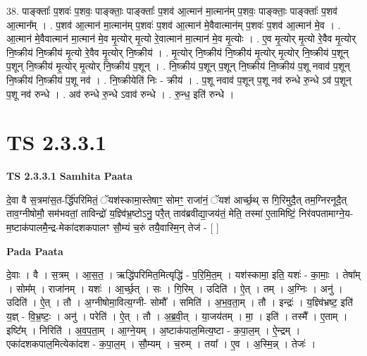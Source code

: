 \documentclass[17pt]{extarticle}
\begin{document}
38. पाङ्क्ताः᳚ प॒शवः॑ प॒शवः॒ पाङ्क्ताः॒ पाङ्क्ताः᳚ प॒शव॑ आ॒त्मान॑ मा॒त्मान॑म् प॒शवः॒ पाङ्क्ताः॒ पाङ्क्ताः᳚ प॒शव॑ आ॒त्मान᳚म् । . प॒शव॑ आ॒त्मान॑ मा॒त्मान॑म् प॒शवः॑ प॒शव॑ आ॒त्मान॑ मे॒वैवात्मान॑म् प॒शवः॑ प॒शव॑ आ॒त्मान॑ मे॒व । . आ॒त्मान॑ मे॒वैवात्मान॑ मा॒त्मान॑ मे॒व मृ॒त्योर् मृ॒त्यो रे॒वात्मान॑ मा॒त्मान॑ मे॒व मृ॒त्योः । . ए॒व मृ॒त्योर् मृ॒त्यो रे॒वैव मृ॒त्योर् नि॒ष्क्रीय॑ नि॒ष्क्रीय॑ मृ॒त्यो रे॒वैव मृ॒त्योर् नि॒ष्क्रीय॑ । . मृ॒त्योर् नि॒ष्क्रीय॑ नि॒ष्क्रीय॑ मृ॒त्योर् मृ॒त्योर् नि॒ष्क्रीय॑ प॒शून् प॒शून् नि॒ष्क्रीय॑ मृ॒त्योर् मृ॒त्योर् नि॒ष्क्रीय॑ प॒शून् । . नि॒ष्क्रीय॑ प॒शून् प॒शून् नि॒ष्क्रीय॑ नि॒ष्क्रीय॑ प॒शू नवाव॑ प॒शून् नि॒ष्क्रीय॑ नि॒ष्क्रीय॑ प॒शू नव॑ । . नि॒ष्क्रीयेति॑ निः - क्रीय॑ । . प॒शू नवाव॑ प॒शून् प॒शू नव॑ रुन्धे रु॒न्धे ऽव॑ प॒शून् प॒शू नव॑ रुन्धे । . अव॑ रुन्धे रु॒न्धे ऽवाव॑ रुन्धे । . रु॒न्ध॒ इति॑ रुन्धे । \newline
\pagebreak
{}

\section{ TS 2.3.3.1 }

\textbf{TS 2.3.3.1 } \newline
\textbf{Samhita Paata} \newline

दे॒वा वै स॒त्रमा॑स॒त-र्द्धि॑परिमितं॒ ॅयश॑स्कामा॒स्तेषाꣳ॒॒ सोमꣳ॒॒ राजा॑नं॒ ॅयश॑ आर्च्छ॒थ् स गि॒रिमुदै॒त् तम॒ग्निरनूदै॒त् ताव॒ग्नीषोमौ॒ सम॑भवतां॒ ताविन्द्रो॑ य॒ज्ञ्वि॑भ्र॒ष्टोऽनु॒ परै॒त् ताव॑ब्रवीद्या॒जय॑तं॒ मेति॒ तस्मा॑ ए॒तामिष्टिं॒ निर॑वपतामाग्ने॒य-म॒ष्टाक॑पालमै॒न्द्र-मेका॑दशकपालꣳ सौ॒म्यं च॒रुं तयै॒वास्मि॒न् तेज॑ - [  ] \newline

\textbf{Pada Paata} \newline

दे॒वाः । वै । स॒त्रम् । आ॒स॒त॒ । ऋद्धि॑परिमित॒मित्यृद्धि॑ - प॒रि॒मि॒त॒म् । यश॑स्कामा॒ इति॒ यशः॑ - का॒माः॒ । तेषा᳚म् । सोम᳚म् । राजा॑नम् । यशः॑ । आ॒र्च्छ॒त् । सः । गि॒रिम् । उदिति॑ । ऐ॒त् । तम् । अ॒ग्निः । अनु॑ । उदिति॑ । ऐ॒त् । तौ । अ॒ग्नीषोमा॒वित्य॒ग्नी- सोमौ᳚ । समिति॑ । अ॒भ॒व॒ता॒म् । तौ । इन्द्रः॑ । य॒ज्ञ्वि॑भ्रष्ट॒ इति॑ य॒ज्ञ् - वि॒भ्र॒ष्टः॒ । अनु॑ । परेति॑ । ऐ॒त् । तौ । अ॒ब्र॒वी॒त् । या॒जय॑तम् । मा॒ । इति॑ । तस्मै᳚ । ए॒ताम् । इष्टि᳚म् । निरिति॑ । अ॒व॒प॒ता॒म् । आ॒ग्ने॒यम् । अ॒ष्टाक॑पाल॒मित्य॒ष्टा - क॒पा॒ल॒म् । ऐ॒न्द्रम् । एका॑दशकपाल॒मित्येका॑दश - क॒पा॒ल॒म् । सौ॒म्यम् । च॒रुम् । तया᳚ । ए॒व । अ॒स्मि॒न्न् । तेजः॑ ।  \newline
\end{document}
